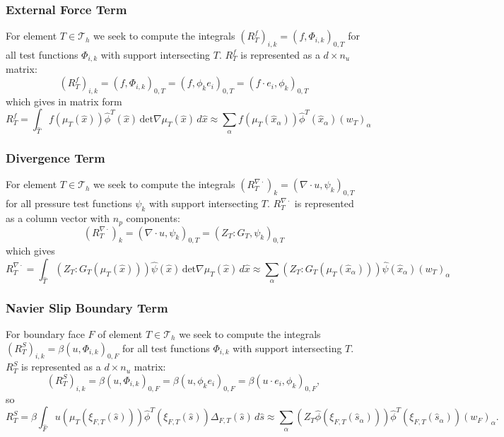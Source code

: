 \documentclass[a4paper,12pt]{article}
\theoremstyle{definition}
\begin{document}
\subsubsection*{External Force Term}

For element $T\in\mathcal{T}_h$ we seek to compute the integrals 
$(R^{f}_T)_{i,k} = ( f, \Phi_{i,k})_{0,T}$ for all test functions $\Phi_{i,k}$
with support intersecting $T$. $R^f_T$ is represented as a $d\times n_u$ matrix:
\begin{equation*}
(R^{f}_T)_{i,k} = \left( f,\Phi_{i,k}\right)_{0,T} =  \left( f,\phi_{k} e_i\right)_{0,T} =  \left( f\cdot e_i,\phi_{k}\right)_{0,T}
\end{equation*}
which gives in matrix form
\begin{equation}
R^{f}_T = \int_{\hat T} f(\mu_T(\hat x)) \hat\phi^T(\hat x)  \, \text{det} \nabla\mu_T(\hat x) \,d\hat x
\approx \sum_\alpha f(\mu_T(\hat x_\alpha)) \hat\phi^T(\hat x_\alpha) (w_T)_\alpha
\end{equation}

\subsubsection*{Divergence Term}

For element $T\in\mathcal{T}_h$ we seek to compute the integrals 
$(R^{\nabla\cdot}_T)_{k} = ( \nabla\cdot u, \psi_{k})_{0,T}$ for all pressure test functions $\psi_{k}$
with support intersecting $T$. $R^{\nabla\cdot}_T$ is represented as a column vector with $n_p$ components:
\begin{equation*}
(R^{\nabla\cdot}_T)_{k} = \left( \nabla\cdot u,\psi_{k}\right)_{0,T} 
= \left( Z_T:G_T,\psi_{k}\right)_{0,T} 
\end{equation*}
which gives 
\begin{equation*}
R^{\nabla\cdot}_T = \int_{\hat T} (Z_T : G_T(\mu_T(\hat x))) \hat\psi(\hat x) \, \text{det} \nabla\mu_T(\hat x) \,d\hat x
\approx \sum_\alpha  (Z_T : G_T(\mu_T(\hat x_\alpha))) \hat\psi(\hat x_\alpha) (w_T)_\alpha
\end{equation*}

\subsubsection*{Navier Slip Boundary Term}

For boundary face $F$ of element $T\in\mathcal{T}_h$ we seek to compute the integrals 
$(R^{S}_T)_{i,k} = \beta ( u , \Phi_{i,k})_{0,F}$ for all test functions $\Phi_{i,k}$
with support intersecting $T$. $R^{S}_T$ is represented as a $d\times n_u$ matrix:
\begin{equation*}
(R^{S}_T)_{i,k} = \beta ( u , \Phi_{i,k})_{0,F} = \beta ( u , \phi_{k}e_i )_{0,F} = \beta ( u\cdot e_i , \phi_{k} )_{0,F} ,
\end{equation*}
so
\begin{equation}
R^{S}_T = \beta \int_{\hat F} u(\mu_T(\xi_{F,T}(\hat s)))  \hat\phi^T(\xi_{F,T}(\hat s)) \Delta_{F,T}(\hat s) \,d\hat s
\approx \sum_\alpha (Z_T \hat\phi(\xi_{F,T}(\hat s_\alpha))) \hat\phi^T(\xi_{F,T}(\hat s_\alpha))  (w_F)_\alpha .
\end{equation}
\end{document}
